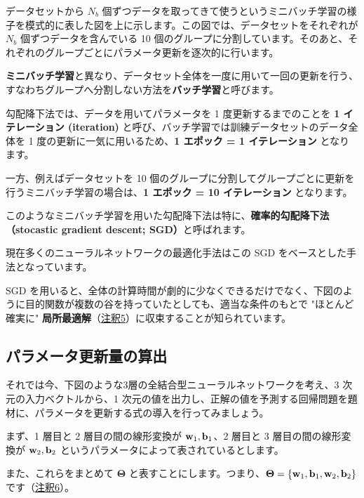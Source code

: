 データセットから $N_b$ 個ずつデータを取ってきて使うというミニバッチ学習の様子を模式的に表した図を上に示します。この図では、データセットをそれぞれが $N_b$ 個ずつデータを含んでいる 10 個のグループに分割しています。そのあと、それぞれのグループごとにパラメータ更新を逐次的に行います。


\textbf{ミニバッチ学習}と異なり、データセット全体を一度に用いて一回の更新を行う、すなわちグループへ分割しない方法を\textbf{バッチ学習}と呼びます。


勾配降下法では、データを用いてパラメータを 1 度更新するまでのことを \textbf{1 イテレーション (iteration)} と呼び、バッチ学習では訓練データセットのデータ全体を 1 度の更新に一気に用いるため、\textbf{1 エポック = 1 イテレーション} となります。

一方、例えばデータセットを 10 個のグループに分割してグループごとに更新を行うミニバッチ学習の場合は、\textbf{1 エポック = 10 イテレーション} となります。


このようなミニバッチ学習を用いた勾配降下法は特に、\textbf{確率的勾配降下法（stocastic gradient descent; SGD）}と呼ばれます。

現在多くのニューラルネットワークの最適化手法はこの SGD をベースとした手法となっています。

SGD を用いると、全体の計算時間が劇的に少なくできるだけでなく、下図のように目的関数が複数の谷を持っていたとしても、適当な条件のもとで "ほとんど確実に" \textbf{局所最適解}（\hyperref[23-basics-of-neural-networks-note5]{注釈5}）に収束することが知られています。




\subsection{パラメータ更新量の算出}


それでは今、下図のような3層の全結合型ニューラルネットワークを考え、3 次元の入力ベクトルから、1 次元の値を出力し、正解の値を予測する回帰問題を題材に、パラメータを更新する式の導入を行ってみましょう。


まず、1 層目と 2 層目の間の線形変換が ${\bf w}_1, {\bf b}_1$、2 層目と 3 層目の間の線形変換が ${\bf w}_2, {\bf b}_2$ というパラメータによって表されているとします。

また、これらをまとめて $\boldsymbol{\Theta}$ と表すことにします。つまり、$\boldsymbol{\Theta} = \{ {\bf w}_1, {\bf b}_1, {\bf w}_2, {\bf b}_2 \}$ です（\hyperref[23-basics-of-neural-networks-note6]{注釈6}）。


